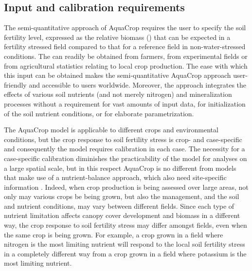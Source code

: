 \subsection{Input and calibration requirements}
The semi-quantitative approach of AquaCrop requires the user to specify the soil fertility level, expressed as the relative biomass (\Brel) that can be expected in a fertility stressed field compared to that for a reference field in non-water-stressed conditions. The \Brel can readily be obtained from farmers, from experimental fields or from agricultural statistics relating to local crop production. The ease with which this input can be obtained makes the semi-quantitative AquaCrop approach user-friendly and accessible to users worldwide. Moreover, the approach integrates the effects of various soil nutrients (and not merely nitrogen) and mineralization processes without a requirement for vast amounts of input data, for initialization of the soil nutrient conditions, or for elaborate parametrization.

The AquaCrop model is applicable to different crops and environmental conditions, but the crop response to soil fertility stress is crop- and case-specific and consequently the model requires calibration in each case. The necessity for a case-specific calibration diminishes the practicability of the model for analyses on a large spatial scale, but in this respect AquaCrop is no different from models that make use of a nutrient-balance approach, which also need site-specific information \parencite{gabrielle2002, matthews2002}. Indeed, when crop production is being assessed over large areas, not only may various crops be being grown, but also the management, and the soil and nutrient conditions, may vary between different fields. Since each type of nutrient limitation affects canopy cover development and biomass in a different way, the crop response to soil fertility stress may differ amongst fields, even when the same crop is being grown. For example, a crop grown in a field where nitrogen is the most limiting nutrient will respond to the local soil fertility stress in a completely different way from a crop grown in a field where potassium is the most limiting nutrient. 

